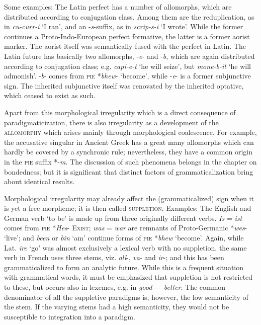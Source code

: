 Some examples: The Latin perfect has a number of allomorphs, which are distributed according to conjugation class. Among them are the reduplication, as in \textit{cu-curr-i} ‘I ran’, and an -\textit{s}{}-suffix, as in \textit{scrip-s-i} ‘I wrote’. While the former continues a Proto-Indo-European perfect formative, the latter is a former aorist marker. The aorist itself was semantically fused with the perfect in Latin. The Latin future has basically two allomorphs, -\textit{e}{}- and -\textit{b}, which are again distributed according to conjugation class; e.g. \textit{capi-e-t} ‘he will seize’, but \textit{mone-b-it} ‘he will admonish’. -\textit{b}{}- comes from \textsc{pie} *\textit{bhew}{}- ‘become’, while -\textit{e}{}- is a former subjunctive sign. The inherited subjunctive itself was renovated by the inherited optative, which ceased to exist as such.

Apart from this morphological irregularity which is a direct consequence of paradigmaticization, there is also irregularity as a development of the \textsc{allomorphy} which arises mainly through morphological coalescence. For example, the accusative singular in Ancient Greek has a great many allomorphs which can hardly be covered by a synchronic rule; nevertheless, they have a common origin in the \textsc{pie} suffix *-\textit{m}. The discussion of such phenomena belongs in the chapter on bondedness; but it is significant that distinct factors of grammaticalization bring about identical results.

Morphological irregularity may already affect the (grammaticalized) sign when it is yet a free morpheme; it is then called \textsc{suppletion}. Examples: The English and German verb ‘to be’ is made up from three originally different verbs. \textit{Is} = \textit{ist} comes from \textsc{pie} *\textit{Hes}{}- \textsc{Exist}; \textit{was} = \textit{war} are remnants of Proto-Germanic *\textit{wes}{}- ‘live’; and \textit{been} or \textit{bin} ‘am’ continue forms of \textsc{pie} *\textit{bhew} ‘become’. Again, while Lat. \textit{ire} ‘go’ was almost exclusively a lexical verb with no suppletion, the same verb in French uses three stems, viz. \textit{all}{}-, \textit{va}{}- and \textit{ir}{}-; and this has been grammaticalized to form an analytic future. While this is a frequent situation with grammatical words, it must be emphasized that suppletion is not restricted to these, but occurs also in lexemes, e.g. in \textit{good} — \textit{better}. The common denominator of all the suppletive paradigms is, however, the low semanticity of the stem. If the varying stems had a high semanticity, they would not be susceptible to integration into a paradigm.

